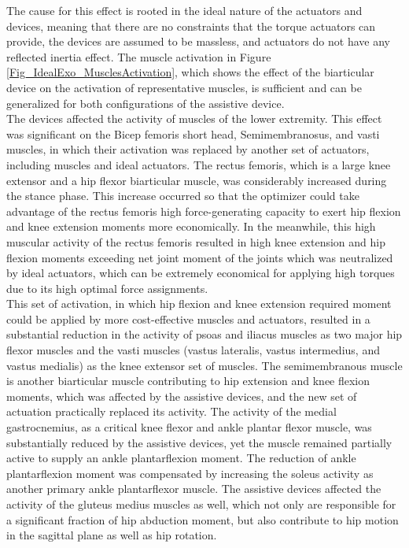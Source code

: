 \documentclass[10pt,letterpaper]{article}
\begin{document}
The cause for this effect is rooted in the ideal nature of the actuators and devices, meaning that there are no constraints that the torque actuators can provide, the devices are assumed to be massless, and actuators do not have any reflected inertia effect. The muscle activation in Figure \ref{Fig_IdealExo_MusclesActivation}, which shows the effect of the biarticular device on the activation of representative muscles, is sufficient and can be generalized for both configurations of the assistive device. \\
The devices affected the activity of muscles of the lower extremity. This effect was significant on the Bicep femoris short head, Semimembranosus, and vasti muscles, in which their activation was replaced by another set of actuators, including muscles and ideal actuators.  The rectus femoris, which is a large knee extensor and a hip flexor biarticular muscle, was considerably increased during the stance phase. This increase occurred so that the optimizer could take advantage of the rectus femoris high force-generating capacity to exert hip flexion and knee extension moments more economically. In the meanwhile, this high muscular activity of the rectus femoris resulted in high knee extension and hip flexion moments exceeding net joint moment of the joints which was neutralized by ideal actuators, which can be extremely economical for applying high torques due to its high optimal force assignments.\\
This set of activation, in which hip flexion and knee extension required moment could be applied by more cost-effective muscles and actuators, resulted in a substantial reduction in the activity of psoas and iliacus muscles as two major hip flexor muscles and the vasti muscles (vastus lateralis, vastus intermedius, and vastus medialis) as the knee extensor set of muscles. The semimembranous muscle is another biarticular muscle contributing to hip extension and knee flexion moments, which was affected by the assistive devices, and the new set of actuation practically replaced its activity. The activity of the medial gastrocnemius, as a critical knee flexor and ankle plantar flexor muscle, was substantially reduced by the assistive devices, yet the muscle remained partially active to supply an ankle plantarflexion moment. The reduction of ankle plantarflexion moment was compensated by increasing the soleus activity as another primary ankle plantarflexor muscle. The assistive devices affected the activity of the gluteus medius muscles as well, which not only are responsible for a significant fraction of hip abduction moment, but also contribute to hip motion in the sagittal plane as well as hip rotation.\\
\end{document}
